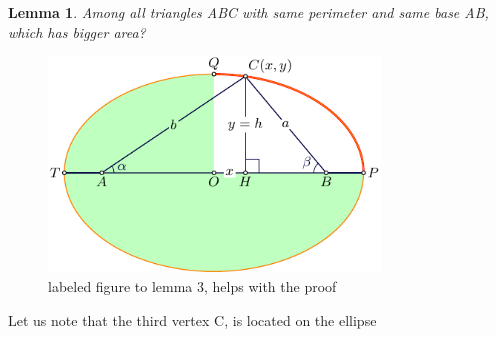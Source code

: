 \documentclass[a4paper]{book}
\newtheorem{lemma}[theorem]{Lemma}%
\numberwithin{theorem}{section}%
\begin{document}
\begin{lemma} 
    Among all triangles ABC with same perimeter and same base AB, which has bigger area?
\end{lemma}
\begin{figure}[hbt!]
    \begin{center}   
        \includegraphics[width=88mm]{lemma3}
        \caption{labeled figure to lemma 3, helps with the proof}
    \end{center}
\end{figure}\leavevmode
Let us note that the third vertex $\mathrm{C}$, is located on the ellipse
\end{document}
